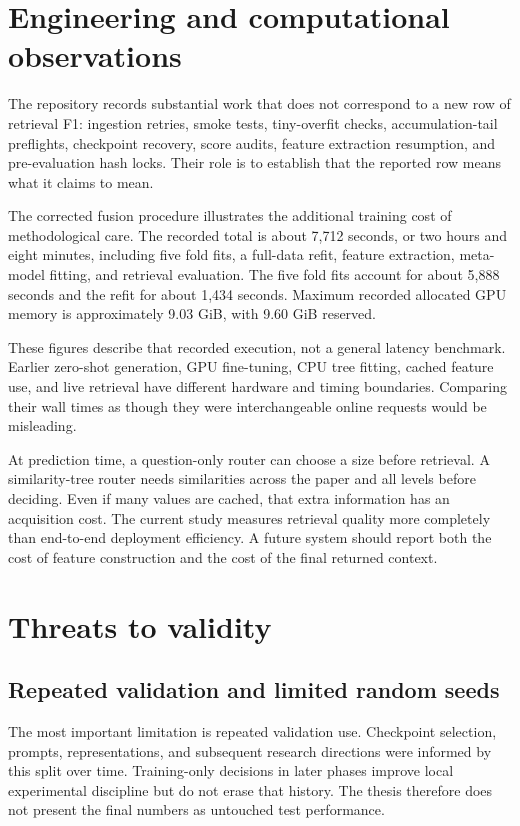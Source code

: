 \section{Engineering and computational observations}
The repository records substantial work that does not correspond
to a new row of retrieval F1: ingestion retries, smoke tests,
tiny-overfit checks, accumulation-tail preflights, checkpoint
recovery, score audits, feature extraction resumption, and
pre-evaluation hash locks. Their role is to establish that the
reported row means what it claims to mean.

The corrected fusion procedure illustrates the additional training
cost of methodological care. The recorded total is about 7,712
seconds, or two hours and eight minutes, including five fold
fits, a full-data refit, feature extraction, meta-model fitting,
and retrieval evaluation. The five fold fits account for about
5,888 seconds and the refit for about 1,434 seconds. Maximum
recorded allocated GPU memory is approximately 9.03 GiB, with
9.60 GiB reserved.

These figures describe that recorded execution, not a general
latency benchmark. Earlier zero-shot generation, GPU fine-tuning,
CPU tree fitting, cached feature use, and live retrieval have
different hardware and timing boundaries. Comparing their wall
times as though they were interchangeable online requests would
be misleading.

At prediction time, a question-only router can choose a size
before retrieval. A similarity-tree router needs similarities
across the paper and all levels before deciding. Even if many
values are cached, that extra information has an acquisition
cost. The current study measures retrieval quality more completely
than end-to-end deployment efficiency. A future system should
report both the cost of feature construction and the cost of
the final returned context.

\section{Threats to validity}
\subsection{Repeated validation and limited random seeds}
The most important limitation is repeated validation use.
Checkpoint selection, prompts, representations, and subsequent
research directions were informed by this split over time.
Training-only decisions in later phases improve local experimental
discipline but do not erase that history. The thesis therefore
does not present the final numbers as untouched test performance.

